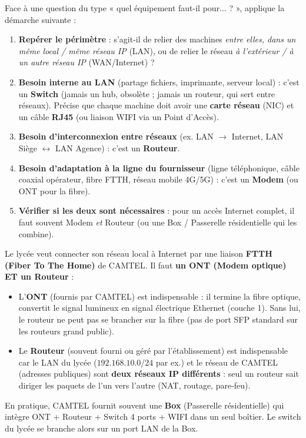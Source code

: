 \documentclass[11pt]{article}
\begin{document}
\begin{methode}
Face à une question du type « quel équipement faut-il pour... ? », applique la démarche suivante :
\begin{enumerate}
\item \textbf{Repérer le périmètre} : s'agit-il de relier des machines \emph{entre elles, dans un même local / même réseau IP} (LAN), ou de relier le réseau \emph{à l'extérieur / à un autre réseau IP} (WAN/Internet) ?
\item \textbf{Besoin interne au LAN} (partage fichiers, imprimante, serveur local) : c'est un \textbf{Switch} (jamais un hub, obsolète ; jamais un routeur, qui sert entre réseaux). Précise que chaque machine doit avoir une \textbf{carte réseau} (NIC) et un câble \textbf{RJ45} (ou liaison WIFI via un Point d'Accès).
\item \textbf{Besoin d'interconnexion entre réseaux} (ex. LAN $\to$ Internet, LAN Siège $\leftrightarrow$ LAN Agence) : c'est un \textbf{Routeur}.
\item \textbf{Besoin d'adaptation à la ligne du fournisseur} (ligne téléphonique, câble coaxial opérateur, fibre FTTH, réseau mobile 4G/5G) : c'est un \textbf{Modem} (ou ONT pour la fibre).
\item \textbf{Vérifier si les deux sont nécessaires} : pour un accès Internet complet, il faut souvent Modem \emph{et} Routeur (ou une Box / Passerelle résidentielle qui les combine).
\end{enumerate}
\end{methode}

\begin{exemplebox}
Le lycée veut connecter son réseau local à Internet par une liaison \textbf{FTTH (Fiber To The Home)} de CAMTEL. Il faut \textbf{un ONT (Modem optique) ET un Routeur} :
\begin{itemize}
\item L'\textbf{ONT} (fournis par CAMTEL) est indispensable : il termine la fibre optique, convertit le signal lumineux en signal électrique Ethernet (couche 1). Sans lui, le routeur ne peut pas se brancher sur la fibre (pas de port SFP standard sur les routeurs grand public).
\item Le \textbf{Routeur} (souvent fourni ou géré par l'établissement) est indispensable car le LAN du lycée ($192.168.10.0/24$ par ex.) et le réseau de CAMTEL (adresses publiques) sont \textbf{deux réseaux IP différents} : seul un routeur sait diriger les paquets de l'un vers l'autre (NAT, routage, pare-feu).
\end{itemize}
En pratique, CAMTEL fournit souvent une \textbf{Box} (Passerelle résidentielle) qui intègre ONT + Routeur + Switch 4 ports + WIFI dans un seul boîtier. Le switch du lycée se branche alors sur un port LAN de la Box.
\end{exemplebox}
\end{document}
